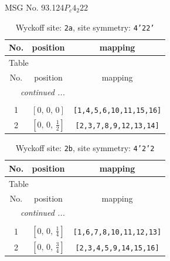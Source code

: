 \documentclass[fleqn,8pt]{jsarticle}
\begin{document}
\setcounter{MaxMatrixCols}{32}

\renewcommand{\tablename}{Table~}
\renewcommand{\figurename}{Figure~}
\begin{center}
\LARGE
MSG No. 93.124\quad$P_{c}4_{2}22$
\end{center}
\renewcommand{\arraystretch}{1.2}
\begin{longtable}{ccc}
\caption{Wyckoff site: {\tt 2a}, site symmetry: {\tt 4'22'}}
 \\
 \hline \hline
No. & position & mapping \\ \hline \endfirsthead

\multicolumn{2}{l}{\tablename\ \thetable{}} \\
 \hline \hline
No. & position & mapping \\ \hline \endhead

 \hline \hline
\multicolumn{2}{r}{\footnotesize\it continued ...} \\ \endfoot

 \hline \hline
\multicolumn{2}{r}{} \\ \endlastfoot

1 & $\left[ 0,\, 0,\, 0 \right]$ & {\tt [1,4,5,6,10,11,15,16]} \\ \hline
2 & $\left[ 0,\, 0,\, \frac{1}{2} \right]$ & {\tt [2,3,7,8,9,12,13,14]} \\
\end{longtable}
\renewcommand{\arraystretch}{1.2}
\begin{longtable}{ccc}
\caption{Wyckoff site: {\tt 2b}, site symmetry: {\tt 4'2'2}}
 \\
 \hline \hline
No. & position & mapping \\ \hline \endfirsthead

\multicolumn{2}{l}{\tablename\ \thetable{}} \\
 \hline \hline
No. & position & mapping \\ \hline \endhead

 \hline \hline
\multicolumn{2}{r}{\footnotesize\it continued ...} \\ \endfoot

 \hline \hline
\multicolumn{2}{r}{} \\ \endlastfoot

1 & $\left[ 0,\, 0,\, \frac{1}{4} \right]$ & {\tt [1,6,7,8,10,11,12,13]} \\ \hline
2 & $\left[ 0,\, 0,\, \frac{3}{4} \right]$ & {\tt [2,3,4,5,9,14,15,16]} \\
\end{longtable}
\end{document}
